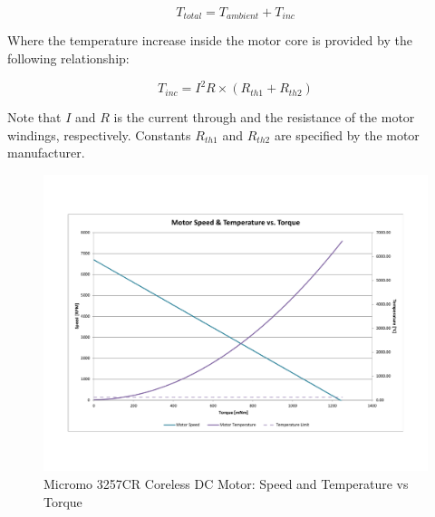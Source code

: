\begin{equation}
	T_{total} = T_{ambient} + T_{inc}
\end{equation}

Where the temperature increase inside the motor core is provided by the following relationship: 

\begin{equation}
	T_{inc} = I^{2}R \times (R_{th1} + R_{th2})
\end{equation}

Note that $I$ and $R$ is the current through and the resistance of the motor windings, respectively. Constants $R_{th1}$ and $R_{th2}$ are specified by the motor manufacturer. 


\begin{figure}[!ht]
	\begin{center}
    \includegraphics[scale=0.6]{fig/ch5/motor3.pdf}
	\end{center}
  \caption{Micromo 3257CR Coreless DC Motor: Speed and Temperature vs Torque}
\end{figure}

